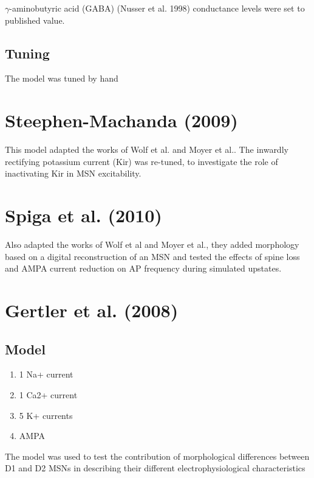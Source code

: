 $\gamma$-aminobutyric acid (GABA) (Nusser et al. 1998) conductance levels were
set to published value.

\subsection{Tuning}

The model was tuned by hand

\section{Steephen-Machanda (2009)}
\label{sec:Steephen-Machanda-2009-MSN}

This model adapted the works of Wolf et al. and Moyer et al.. The inwardly
rectifying potassium current (Kir) was re-tuned, to investigate the role of
inactivating Kir in MSN excitability.

\section{Spiga et al. (2010)}

Also adapted the works of Wolf et al and Moyer et al., they added morphology
based on a digital reconstruction of an MSN and tested the effects of spine loss
and AMPA current reduction on AP frequency during simulated upstates.

\section{Gertler et al. (2008)}
\label{sec:Gertler-2008}

\subsection{Model}

\begin{enumerate}
  \item 1 Na+ current
  
  \item 1 Ca2+ current
  
  \item 5 K+ currents
  
  \item AMPA
\end{enumerate}

The model was used to test the contribution of morphological differences between
D1 and D2 MSNs in describing their different electrophysiological characteristics

